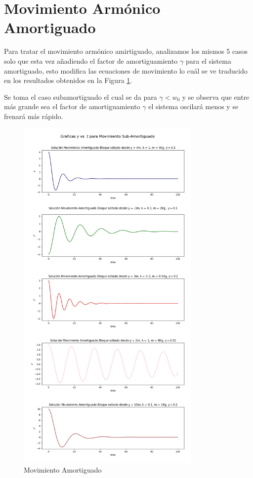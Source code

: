 \documentclass[a4paper]{article}
\begin{document}
\section{Movimiento Armónico Amortiguado}

Para tratar el movimiento armónico amirtiguado, analizamos los mismos 5 casos solo que esta vez añadiendo el factor de amortiguamiento $\gamma$ para el sistema amortiguado, esto modifica las ecuaciones de movimiento lo cuál se ve traducido en los resultados obtenidos en la Figura \ref{fig:Figura3}.

Se toma el caso subamortiguado el cual se da para $\gamma < w_{0}$ y se observa que entre más grande sea el factor de amortiguamiento $\gamma$ el sistema oscilará menos y se frenará más rápido.

\begin{figure}
\centering
\includegraphics[width=0.8\textwidth]{Amortiguado.jpg}
\caption{Movimiento Amortiguado}
\label{fig:Figura3}
\end{figure}
\end{document}
